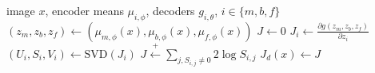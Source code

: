 \begin{algorithmic}[1]
\Require image $x$, encoder means $\mu_{i,\phi}$, decoders $g_{i,\theta}$, $i \in \lbrace m, b, f \rbrace$
\State $\left(z_m, z_b, z_f \right) \leftarrow \left(\mu_{m,\phi}(x), \mu_{b,\phi}(x), \mu_{f,\phi}(x) \right)$
\State $J \leftarrow 0$
    \State $J_i \leftarrow \frac{\partial g\left(z_m, z_b, z_f \right)}{\partial z_i}$
    \State $(U_i,S_i,V_i) \leftarrow \text{SVD}(J_i)$
    \State $J \stackrel{+}\leftarrow \sum_{j,S_{i,j} \neq 0} 2 \log S_{i,j}$
\EndFor
\State $J_d(x) \leftarrow J$
\end{algorithmic}
